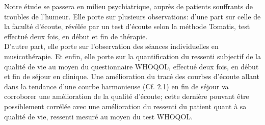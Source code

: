   Notre étude se passera  en milieu psychiatrique, 
auprès de patients souffrants de troubles de l'humeur.
 Elle porte sur plusieurs observations: d'une part sur celle de la faculté d'écoute, révélée par un test 
 d'écoute selon la méthode Tomatis, test effectué deux fois, en début et fin de thérapie.
\\
D'autre part, elle porte sur l'observation des séances individuelles en musicothérapie.
Et enfin, elle porte sur la quantification du ressenti subjectif de la qualité de vie au moyen du 
questionnaire WHOQOL, effectué deux fois, en début et fin de séjour en clinique.
Une amélioration du tracé des courbes d'écoute allant dans la tendance d'une courbe harmonieuse (Cf. 
2.1) en fin de séjour va corroborer une amélioration de la qualité d'écoute; cette dernière pouvant être 
possiblement corrélée avec une amélioration du ressenti du patient quant à sa qualité de vie, ressenti 
mesuré au moyen du test WHOQOL.









